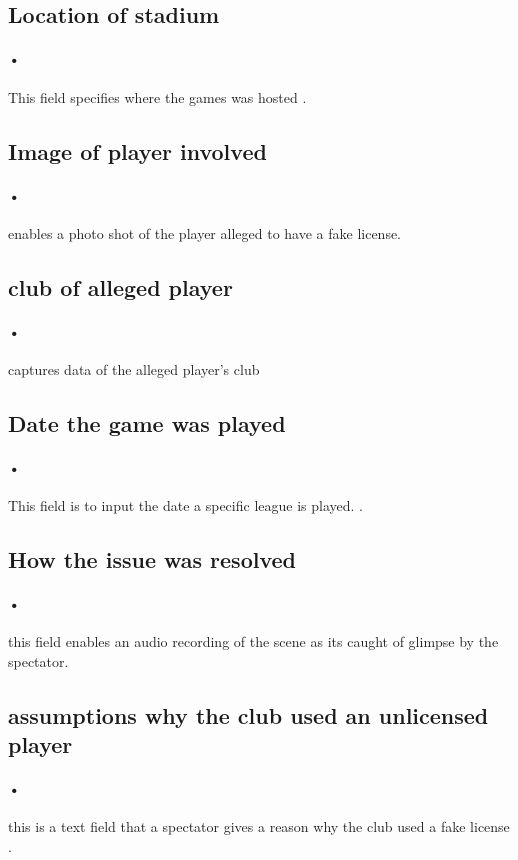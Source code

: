 \documentclass[12pt]{article}
\begin{document}
\subsection{Location of stadium}
\paragraph{•}
This field specifies where the games was hosted .
\subsection{Image of player involved }
\paragraph{•}
enables a photo shot of the player alleged to have a fake license.
\subsection{club of alleged player}
\paragraph{•}
captures data of the alleged player's club

\subsection{ Date the game was played}
\paragraph{•}
This field is to input the date a specific league is played.
.
\subsection{How the issue was resolved }
\paragraph{•}
this field enables an audio recording of the scene as its caught of glimpse by the spectator.

\subsection{assumptions why the club used an unlicensed player  }
\paragraph{•}
this is a text field that a spectator gives a reason why the club used a fake license .
\end{document}
